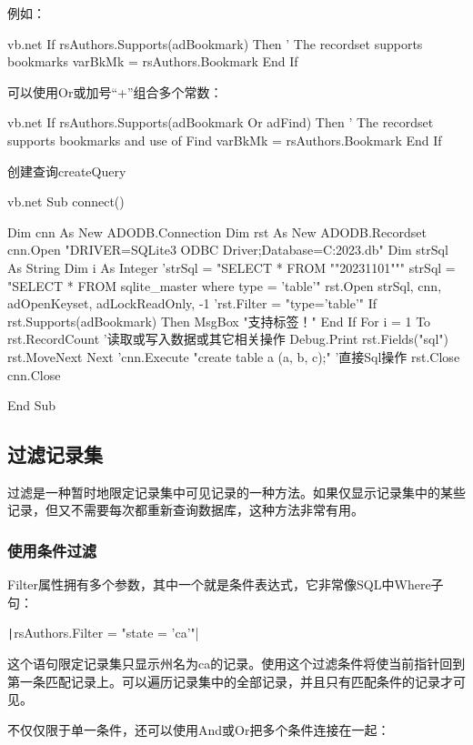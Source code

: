 例如：
\begin{amzcode}{vb.net}
If rsAuthors.Supports(adBookmark) Then
	' The recordset supports bookmarks
	varBkMk = rsAuthors.Bookmark
End If
\end{amzcode}
       可以使用Or或加号``+''组合多个常数：
\begin{amzcode}{vb.net}
       If rsAuthors.Supports(adBookmark Or adFind) Then
              ' The recordset supports bookmarks and use of Find
              varBkMk = rsAuthors.Bookmark
       End If
\end{amzcode}
\begin{codebox}{创建查询}{createQuery}
	\begin{amzcode}{vb.net}
Sub connect()

Dim cnn As New ADODB.Connection
Dim rst As New ADODB.Recordset
cnn.Open "DRIVER={SQLite3 ODBC Driver};Database=C:\Users\Administrator\Desktop\tmp\fee2023.db"
Dim strSql As String
Dim i As Integer
'strSql = "SELECT * FROM ""20231101"""
strSql = "SELECT * FROM sqlite_master where type = 'table'"
rst.Open strSql, cnn, adOpenKeyset, adLockReadOnly, -1
'rst.Filter = "type='table'"
If rst.Supports(adBookmark) Then
MsgBox "支持标签！"
End If
For i = 1 To rst.RecordCount
	'读取或写入数据或其它相关操作
	Debug.Print rst.Fields("sql")
	rst.MoveNext
Next
'cnn.Execute "create table a (a, b, c);" '直接Sql操作
rst.Close
cnn.Close

End Sub
	\end{amzcode}
\end{codebox}
\subsection{过滤记录集}

       过滤是一种暂时地限定记录集中可见记录的一种方法。如果仅显示记录集中的某些记录，但又不需要每次都重新查询数据库，这种方法非常有用。

\subsubsection{使用条件过滤}

Filter属性拥有多个参数，其中一个就是条件表达式，它非常像SQL中Where子句：

\texttt|rsAuthors.Filter = "state = 'ca'"|

这个语句限定记录集只显示州名为ca的记录。使用这个过滤条件将使当前指针回到第一条匹配记录上。可以遍历记录集中的全部记录，并且只有匹配条件的记录才可见。

不仅仅限于单一条件，还可以使用And或Or把多个条件连接在一起：

